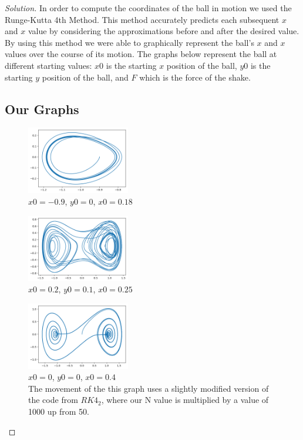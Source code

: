 \documentclass[aps,pra,notitlepage,amsmath,amssymb,letterpaper,12pt]{revtex4-1}
\newenvironment{solution}{\begin{proof}[Solution]}{\end{proof}}
\begin{document}
\begin{solution}
In order to compute the coordinates of the ball in motion we used the Runge-Kutta 4th Method. This method accurately predicts each subsequent $x$ and $x$ value by considering the approximations before and after the desired value. By using this method we were able to graphically represent the ball's $x$ and $x$ values over the course of its motion. The graphs below represent the ball at different starting values: $x0$ is the starting $x$ position of the ball, $y0$ is the starting $y$ position of the ball, and $F$ which is the force of the shake.

\subsection{Our Graphs}

\begin{figure}[h!]
  \includegraphics[width=0.4\textwidth]{p1.png}
  \caption{$x0=-0.9$, $y0=0$, $x0=0.18$}
  \label{fig:figlabel}
\end{figure}

\begin{figure}[h!]
  \includegraphics[width=0.4\textwidth]{p2.png}
  \caption{$x0=0.2$, $y0=0.1$, $x0=0.25$}
  \label{fig:figlabel}
\end{figure}

\begin{figure}[h!]
  \includegraphics[width=0.4\textwidth]{p3.png}
  \caption{$x0=0$, $y0=0$, $x0=0.4$ \\ The movement of the this graph uses a slightly modified version of the code from $RK4_2$, where our N value is multiplied by a value of 1000 up from 50.}
  \label{fig:figlabel}
\end{figure}


\end{solution}
\end{document}
